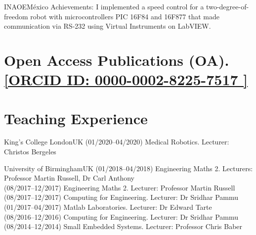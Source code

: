 \documentclass[10pt,a4paper,roman]{moderncv}
\begin{document}
{INAOE}{M\'exico}{}
{Achievements:
I implemented a speed control for a two-degree-of-freedom robot with microcontrollers
PIC 16F84 and 16F877 that made communication via RS-232 using Virtual Instruments on LabVIEW.
}


\vspace{20mm}


\section{Open Access Publications (OA).
	\href{http://orcid.org/0000-0002-8225-7517}{ [ORCID ID: 0000-0002-8225-7517 \faExternalLink]}
	}





%


\section{Teaching Experience}

{King's College London}{UK}{}
{
(01/2020--04/2020) Medical Robotics. Lecturer: Christos Bergeles
}



{University of Birmingham}{UK}{}
{
(01/2018--04/2018) Engineering Maths 2. Lecturers: Professor Martin Russell, Dr Carl Anthony \\
(08/2017--12/2017) Engineering Maths 2. Lecturer: Professor Martin Russell \\
(08/2017--12/2017) Computing for Engineering. Lecturer: Dr Sridhar Pammu \\
(01/2017--04/2017) Matlab Laboratories. Lecturer: Dr Edward Tarte \\
(08/2016--12/2016) Computing for Engineering. Lecturer: Dr Sridhar Pammu \\
(08/2014--12/2014) Small Embedded Systems. Lecturer: Professor Chris Baber
}
\end{document}
